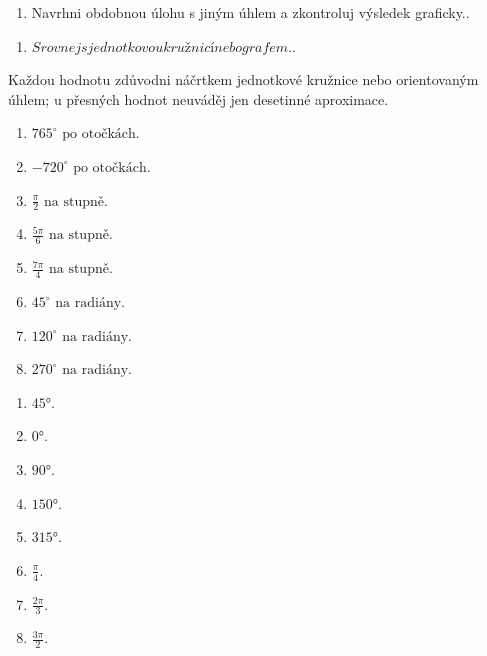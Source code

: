 \documentclass[11pt,a4paper]{article}
\begin{document}
\begin{zadaniReseniBox}[title={Rozšíření 1}]
\begin{enumerate}[label=\alph*)]
\item Navrhni obdobnou úlohu s jiným úhlem a zkontroluj výsledek graficky..
\end{enumerate}
\tcblower
\begin{enumerate}[label=\alph*)]
\item $Srovnej s jednotkovou kružnicí nebo grafem.$.
\end{enumerate}
\end{zadaniReseniBox}
Každou hodnotu zdůvodni náčrtkem jednotkové kružnice nebo orientovaným úhlem; u přesných hodnot neuváděj jen desetinné aproximace.
\begin{zadaniReseniBox}[title={Domácí úkol}]
\begin{enumerate}[label=\alph*)]
\item $765^\circ\text{ po otočkách}$.
\item $-720^\circ\text{ po otočkách}$.
\item $\frac{\pi}{2}\text{ na stupně}$.
\item $\frac{5\pi}{6}\text{ na stupně}$.
\item $\frac{7\pi}{4}\text{ na stupně}$.
\item $45^\circ\text{ na radiány}$.
\item $120^\circ\text{ na radiány}$.
\item $270^\circ\text{ na radiány}$.
\end{enumerate}
\tcblower
\begin{enumerate}[label=\alph*)]
\item $45°$.
\item $0°$.
\item $90°$.
\item $150°$.
\item $315°$.
\item $\frac{\pi}{4}$.
\item $\frac{2\pi}{3}$.
\item $\frac{3\pi}{2}$.
\end{enumerate}
\end{zadaniReseniBox}
\end{document}
